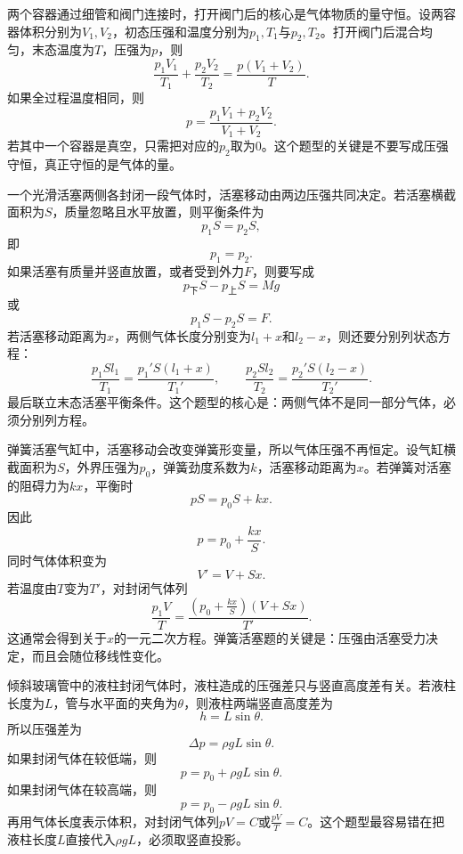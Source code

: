 \begin{casetypebox}[title={\strut\textcolor{white}{\bfseries 常见题型：两气缸连通问题}}]
两个容器通过细管和阀门连接时，打开阀门后的核心是气体物质的量守恒。设两容器体积分别为$V_1,V_2$，初态压强和温度分别为$p_1,T_1$与$p_2,T_2$。打开阀门后混合均匀，末态温度为$T$，压强为$p$，则
\[
  \frac{p_1V_1}{T_1}+\frac{p_2V_2}{T_2}
  =
  \frac{p(V_1+V_2)}{T}.
\]
如果全过程温度相同，则
\[
  p=\frac{p_1V_1+p_2V_2}{V_1+V_2}.
\]
若其中一个容器是真空，只需把对应的$p_2$取为0。这个题型的关键是不要写成压强守恒，真正守恒的是气体的量。
\end{casetypebox}

\begin{casetypebox}[title={\strut\textcolor{white}{\bfseries 常见题型：活塞两侧封闭气体}}]
一个光滑活塞两侧各封闭一段气体时，活塞移动由两边压强共同决定。若活塞横截面积为$S$，质量忽略且水平放置，则平衡条件为
\[
  p_1S=p_2S,
\]
即
\[
  p_1=p_2.
\]
如果活塞有质量并竖直放置，或者受到外力$F$，则要写成
\[
  p_{\text{下}}S-p_{\text{上}}S=Mg
\]
或
\[
  p_1S-p_2S=F.
\]
若活塞移动距离为$x$，两侧气体长度分别变为$l_1+x$和$l_2-x$，则还要分别列状态方程：
\[
  \frac{p_1Sl_1}{T_1}=\frac{p_1'S(l_1+x)}{T_1'},
  \qquad
  \frac{p_2Sl_2}{T_2}=\frac{p_2'S(l_2-x)}{T_2'}.
\]
最后联立末态活塞平衡条件。这个题型的核心是：两侧气体不是同一部分气体，必须分别列方程。
\end{casetypebox}

\begin{casetypebox}[title={\strut\textcolor{white}{\bfseries 常见题型：弹簧活塞气缸}}]
弹簧活塞气缸中，活塞移动会改变弹簧形变量，所以气体压强不再恒定。设气缸横截面积为$S$，外界压强为$p_0$，弹簧劲度系数为$k$，活塞移动距离为$x$。若弹簧对活塞的阻碍力为$kx$，平衡时
\[
  pS=p_0S+kx.
\]
因此
\[
  p=p_0+\frac{kx}{S}.
\]
同时气体体积变为
\[
  V'=V+Sx.
\]
若温度由$T$变为$T'$，对封闭气体列
\[
  \frac{p_1V}{T}=
  \frac{\left(p_0+\frac{kx}{S}\right)(V+Sx)}{T'}.
\]
这通常会得到关于$x$的一元二次方程。弹簧活塞题的关键是：压强由活塞受力决定，而且会随位移线性变化。
\end{casetypebox}

\begin{casetypebox}[title={\strut\textcolor{white}{\bfseries 常见题型：倾斜管液柱问题}}]
倾斜玻璃管中的液柱封闭气体时，液柱造成的压强差只与竖直高度差有关。若液柱长度为$L$，管与水平面的夹角为$\theta$，则液柱两端竖直高度差为
\[
  h=L\sin\theta.
\]
所以压强差为
\[
  \Delta p=\rho gL\sin\theta.
\]
如果封闭气体在较低端，则
\[
  p=p_0+\rho gL\sin\theta.
\]
如果封闭气体在较高端，则
\[
  p=p_0-\rho gL\sin\theta.
\]
再用气体长度表示体积，对封闭气体列$pV=C$或$\frac{pV}{T}=C$。这个题型最容易错在把液柱长度$L$直接代入$\rho gL$，必须取竖直投影。
\end{casetypebox}

